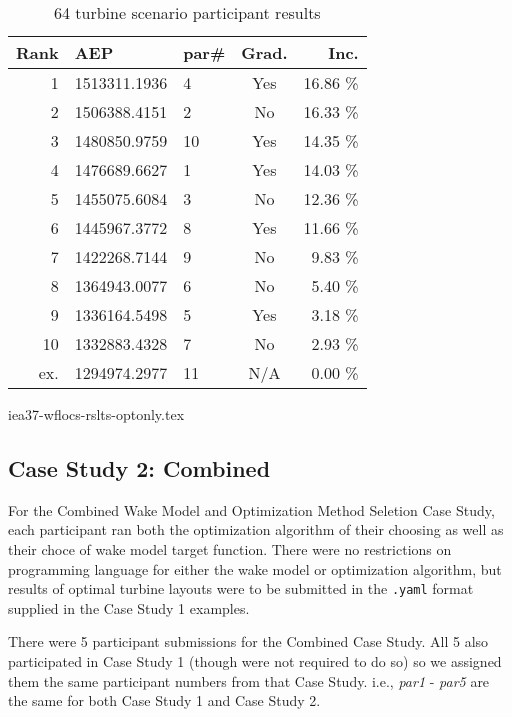		\begin{table}[H]
			\begin{center}
				\caption{64 turbine scenario participant results}
				\label{tab:results3}
				\begin{tabular}{r l l c r}
					\hline
					Rank        & AEP         	& par\# & Grad.	& Inc.\\
					\hline
					1			& 1513311.1936	& 4 	& Yes   & 16.86 \%\\
					2			& 1506388.4151	& 2		& No    & 16.33 \%\\
					3			& 1480850.9759	& 10	& Yes   & 14.35 \%\\
					4			& 1476689.6627 	& 1		& Yes   & 14.03 \%\\
					5			& 1455075.6084	& 3		& No    & 12.36 \%\\
					6			& 1445967.3772	& 8		& Yes   & 11.66 \%\\
					7			& 1422268.7144	& 9		& No    &  9.83 \%\\
					8			& 1364943.0077	& 6		& No    &  5.40 \%\\
					9			& 1336164.5498 	& 5		& Yes	&  3.18 \%\\
					10			& 1332883.4328	& 7		& No    &  2.93 \%\\
					ex.			& 1294974.2977	& 11	& N/A	&  0.00 \%\\
					\hline
				\end{tabular}
			\end{center}
		\end{table}

	{iea37-wflocs-rslts-optonly.tex}

\subsection{Case Study 2: Combined}\label{sec:res-cmbnd}

	For the Combined Wake Model and Optimization Method Seletion Case Study, each participant ran both the optimization algorithm of their choosing as well as their choce of wake model target function.
	There were no restrictions on programming language for either the wake model or optimization algorithm, but results of optimal turbine layouts were to be submitted in the \texttt{.yaml} format supplied in the Case Study 1 examples.

	There were 5 participant submissions for the Combined Case Study.
	All 5 also participated in Case Study 1 (though were not required to do so) so we assigned them the same participant numbers from that Case Study.
	i.e., \textit{par1} - \textit{par5} are the same for both Case Study 1 and Case Study 2.

